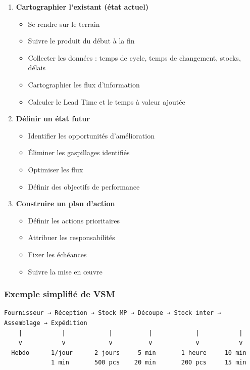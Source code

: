 \documentclass[a4paper,12pt]{article}
\begin{document}
\begin{enumerate}
    \item \textbf{Cartographier l'existant (état actuel)}
    \begin{itemize}
        \item Se rendre sur le terrain
        \item Suivre le produit du début à la fin
        \item Collecter les données : temps de cycle, temps de changement, stocks, délais
        \item Cartographier les flux d'information
        \item Calculer le Lead Time et le temps à valeur ajoutée
    \end{itemize}
    
    \item \textbf{Définir un état futur}
    \begin{itemize}
        \item Identifier les opportunités d'amélioration
        \item Éliminer les gaspillages identifiés
        \item Optimiser les flux
        \item Définir des objectifs de performance
    \end{itemize}
    
    \item \textbf{Construire un plan d'action}
    \begin{itemize}
        \item Définir les actions prioritaires
        \item Attribuer les responsabilités
        \item Fixer les échéances
        \item Suivre la mise en œuvre
    \end{itemize}
\end{enumerate}

\subsubsection{Exemple simplifié de VSM}

\begin{center}
\begin{minipage}{0.9\textwidth}
\begin{verbatim}
Fournisseur → Réception → Stock MP → Découpe → Stock inter → Assemblage → Expédition
    |           |            |          |            |           |
    v           v            v          v            v           v
  Hebdo      1/jour      2 jours     5 min       1 heure     10 min
             1 min       500 pcs    20 min       200 pcs     15 min
\end{verbatim}
\caption{Représentation simplifiée d'une cartographie VSM}
\end{minipage}
\end{center}
\end{document}
